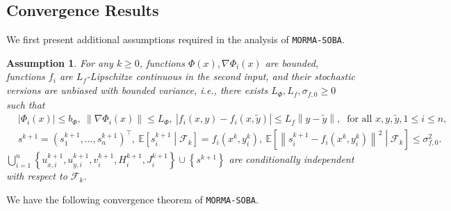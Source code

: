 \documentclass[10pt]{article}
\newtheorem{assumption}{Assumption}
\theoremstyle{remark}
\def\setF{\mathscr{F}} %
\newcommand{\E}{\mathbb{E}}
\newcommand{\norm}[1]{\left\|#1\right\|}
\newcommand{\T}{^\top}
\begin{document}
\subsection{Convergence Results}\label{sec: convergence_momasoba}
We first present additional assumptions required in the analysis of \texttt{MORMA-SOBA}. 
\begin{assumption}\label{aspt: f_bound}
    For any $k\geq 0$, functions $\Phi(x), \nabla \Phi_i(x)$ are bounded, functions $f_i$ are $L_f$-Lipschitze continuous in the second input, and their stochastic versions are unbiased with bounded variance, i.e., there exists $L_{\Phi}, L_f, \sigma_{f,0}\geq 0$ such that 
    \begin{align*}
        &\left|\Phi_i(x)\right|\leq b_{\Phi},\ \norm{\nabla \Phi_i(x)}\leq L_{\Phi},\ \left|f_i(x, y) - f_i(x,\tilde y)\right|\leq L_f\norm{y - \tilde y},\ \text{ for all } x, y, \tilde y, 1\leq i\leq n, \\
        &s^{k+1} = \left(s_1^{k+1}, ..., s_n^{k+1}\right)\T,\ \E\left[s_i^{k+1}\middle|\setF_k\right] = f_i(x^k, y_i^k),\ \E\left[ \norm{s_i^{k+1} -f_i(x^k, y_i^k)}^2\middle|\setF_k\right]\leq \sigma_{f,0}^2.
    \end{align*}
    $\bigcup_{i=1}^{n}\left\{u_{x, i}^{k+1}, u_{y, i}^{k+1}, v_i^{k+1}, H_i^{k+1}, J_i^{k+1}\right\}\cup \left\{s^{k+1}\right\}$ are conditionally independent with respect to $\setF_k$.
\end{assumption}
We have the following convergence theorem of \texttt{MORMA-SOBA}.
\end{document}

